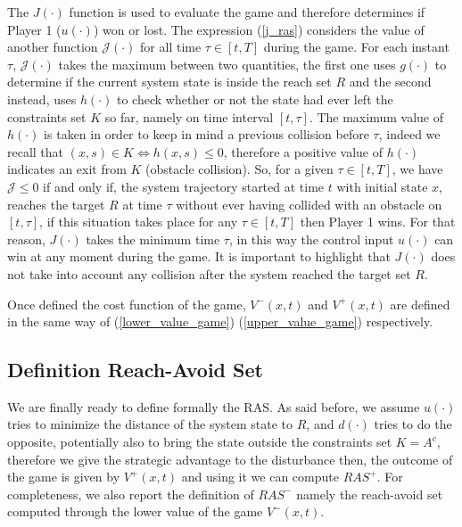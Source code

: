 The $J(\cdot)$ function is used to evaluate the game and therefore determines if Player 1 ($u(\cdot)$) won or lost. The expression (\ref{j_ras}) considers the value of another function $\mathcal{J}(\cdot)$ for all time $\tau \in [t, T]$ during the game. For each instant $\tau$, $\mathcal{J}(\cdot)$ takes the maximum between two quantities, the first one uses $g(\cdot)$ to determine if the current system state is inside the reach set $R$ and the second instead, uses $h(\cdot)$ to check whether or not the state had ever left the constraints set $K$ so far, namely on time interval $[t, \tau]$. The maximum value of $h(\cdot)$ is taken in order to keep in mind a previous collision before $\tau$, indeed we recall that $(x,s) \in K \Leftrightarrow h(x,s) \leq 0$, therefore a positive value of $h(\cdot)$ indicates an exit from $K$ (obstacle collision).
So, for a given $\tau \in [t, T]$, we have $\mathcal{J} \leq 0$ if and only if, the system trajectory started at time $t$ with initial state $x$, reaches the target $R$ at time $\tau$ without ever having collided with an obstacle on $[t, \tau]$, if this situation takes place for any $\tau \in [t, T]$ then Player 1 wins. For that reason, $J(\cdot)$ takes the minimum time $\tau$, in this way the control input $u(\cdot)$ can win at any moment during the game. It is important to highlight that $J(\cdot)$ does not take into account any collision after the system reached the target set $R$. 

Once defined the cost function of the game, $V^-(x,t)$ and $V^+(x,t)$ are defined in the same way of (\ref{lower_value_game}) (\ref{upper_value_game}) respectively.

\subsection{Definition Reach-Avoid Set}
We are finally ready to define formally the RAS. As said before, we assume $u(\cdot)$ tries to minimize the distance of the system state to $R$, and $d(\cdot)$ tries to do the opposite, potentially also to bring the state outside the constraints set $K=A^c$, therefore we give the strategic advantage to the disturbance then, the outcome of the game is given by $V^+(x,t)$ and using it we can compute $RAS^+$. For completeness, we also report the definition of $RAS^-$ namely the reach-avoid set computed through the lower value of the game $V^-(x,t)$.


